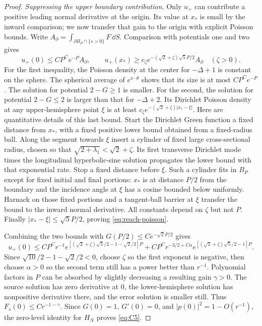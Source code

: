 \begin{proof}
\emph{Suppressing the upper boundary contribution.}
Only $u_+$ can contribute a positive leading normal derivative at the
origin.  Its value at $x_*$ is small by the inward comparison; we
now transfer that gain to the origin with explicit Poisson bounds.
Write $A_\partial=\int_{\partial B_P\cap\{s>0\}}F\,\dd S$.
Comparison with potentials one and two gives
\begin{equation}\label{eq:reach-poisson}
 u_+(0)\le CP^C e^{-P}A_\partial,
 \qquad
 u_+(x_*)\ge c_\zeta
 e^{-(\sqrt2+\zeta)\sqrt5 P/2}A_\partial
 \quad(\zeta>0).
\end{equation}
For the first inequality, the Poisson density at the center for
$-\Delta+1$ is constant on the sphere.  The spherical average of
$e^{x\cdot\theta}$ shows that its size is at most $CP^Ce^{-P}$.
The solution for potential $2-G\ge1$ is smaller.  For the second,
the solution for potential $2-G\le2$ is larger than that for
$-\Delta+2$.  Its Dirichlet Poisson density at any upper-hemisphere
point $\xi$ is at least
$c_\zeta e^{-(\sqrt2+\zeta)|x_*-\xi|}$.  Here are quantitative
details of this last bound.  Start the Dirichlet Green function a
fixed distance from $x_*$, with a fixed positive lower bound obtained
from a fixed-radius ball.  Along the segment towards $\xi$ insert
a cylinder of fixed large cross-sectional radius, chosen so that
$\sqrt{2+\lambda_1}<\sqrt2+\zeta$.  Its first transverse
Dirichlet mode times the longitudinal hyperbolic-sine solution
propagates the lower bound with that exponential rate.  Stop a fixed
distance before $\xi$.  Such a cylinder fits in $B_P$ except for
fixed initial and final portions: $x_*$ is at distance $P/2$ from
the boundary and the incidence angle at $\xi$ has a cosine bounded
below uniformly.  Harnack on those fixed portions and a tangent-ball
barrier at $\xi$ transfer the bound to the inward normal derivative.
All constants depend on $\zeta$ but not $P$.  Finally
$|x_*-\xi|\le\sqrt5 P/2$, proving \eqref{eq:reach-poisson}.

Combining the two bounds with $G(P/2)\le Ce^{-\sqrt2 P/2}$ gives
\[
 u_+(0)\le CP^C r^{-1}
 e^{[(\sqrt2+\zeta)\sqrt5/2-1-\sqrt2/2]P}
 +CP^C r^{-3/2+C\alpha}
 e^{[(\sqrt2+\zeta)\sqrt5/2-1]P}.
\]
Since $\sqrt{10}/2-1-\sqrt2/2<0$, choose $\zeta$ so the first
exponent is negative, then choose $\alpha>0$ so the second term
still has a power better than $r^{-1}$.  Polynomial factors in $P$
can be absorbed by slightly decreasing a resulting gain $\gamma>0$.
The source solution has zero derivative at $0$, the lower-hemisphere
solution has nonpositive derivative there, and the error solution is
smaller still.  Thus $F_s(0)\le Cr^{-1-\gamma}$.  Since
$G(0)=1$, $G'(0)=0$, and $|p(0)|^2=1-O(r^{-1})$, the zero-level
identity for $H_N$ proves \eqref{eq:C5}.
\end{proof}

